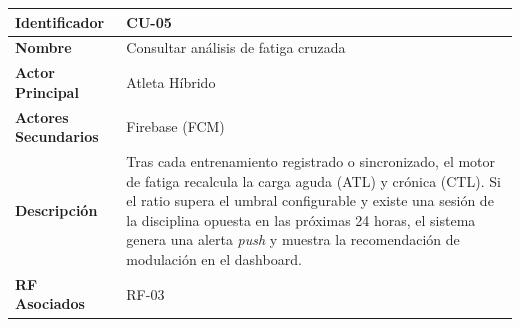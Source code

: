 \documentclass[12pt]{article}
\begin{document}
\begin{table}[h!]
    \centering
    \renewcommand{\arraystretch}{1.3}
    \begin{tabular}{|p{3.5cm}|p{11.5cm}|}
        \hline
        \rowcolor[HTML]{EFEFEF}
        \textbf{Identificador} & \textbf{CU-05} \\ \hline
        \textbf{Nombre} & Consultar análisis de fatiga cruzada \\ \hline
        \textbf{Actor Principal} & Atleta Híbrido \\ \hline
        \textbf{Actores Secundarios} & Firebase (FCM) \\ \hline
        \textbf{Descripción} & Tras cada entrenamiento registrado o sincronizado, el motor de fatiga recalcula la carga aguda (ATL) y crónica (CTL). Si el ratio supera el umbral configurable y existe una sesión de la disciplina opuesta en las próximas 24 horas, el sistema genera una alerta \textit{push} y muestra la recomendación de modulación en el dashboard. \\ \hline
        \textbf{RF Asociados} & RF-03 \\ \hline
    \end{tabular}
\end{table}
\end{document}
